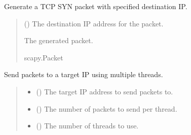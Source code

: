 \documentclass[letterpaper,10pt,english]{sphinxmanual}
\begin{document}
\begin{fulllineitems}
\label{\detokenize{synflood:synflood.generate_packet}}
\pysigstartsignatures
{}
\pysigstopsignatures
\sphinxAtStartPar
Generate a TCP SYN packet with specified destination IP.
\begin{quote}\begin{description}
\sphinxAtStartPar
{} () \textendash{} The destination IP address for the packet.

\sphinxAtStartPar
The generated packet.

\sphinxAtStartPar
scapy.Packet

\end{description}\end{quote}

\end{fulllineitems}


\begin{fulllineitems}
\label{\detokenize{synflood:synflood.send_packets}}
\pysigstartsignatures
{}
\pysigstopsignatures
\sphinxAtStartPar
Send packets to a target IP using multiple threads.
\begin{quote}\begin{description}
\begin{itemize}
\item {} 
\sphinxAtStartPar
{} () \textendash{} The target IP address to send packets to.

\item {} 
\sphinxAtStartPar
{} () \textendash{} The number of packets to send per thread.

\item {} 
\sphinxAtStartPar
{} () \textendash{} The number of threads to use.

\end{itemize}

\end{description}\end{quote}

\end{fulllineitems}
\end{document}
